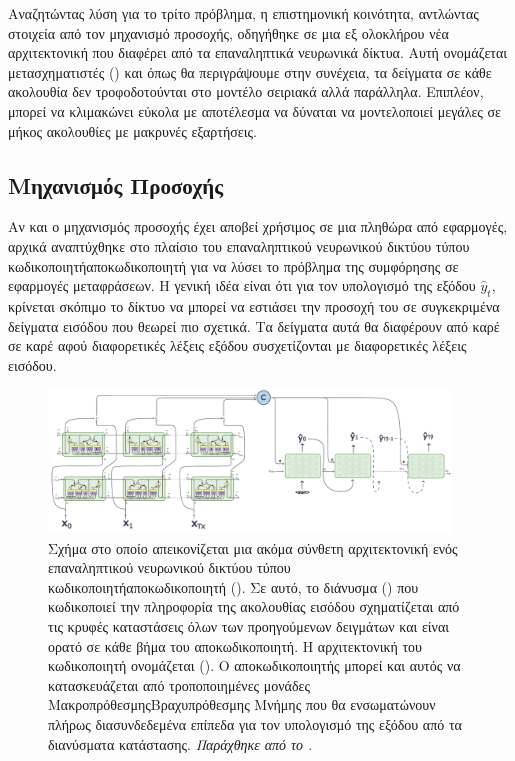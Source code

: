 Αναζητώντας λύση για το τρίτο πρόβλημα, η επιστημονική κοινότητα, αντλώντας στοιχεία από τον μηχανισμό προσοχής, οδηγήθηκε σε μια εξ ολοκλήρου νέα αρχιτεκτονική που διαφέρει από τα επαναληπτικά νευρωνικά δίκτυα. Αυτή ονομάζεται μετασχηματιστές ()\cite{transformers_attention_is_all_you_need} και όπως θα περιγράψουμε στην συνέχεια, τα δείγματα σε κάθε ακολουθία δεν τροφοδοτούνται στο μοντέλο σειριακά αλλά παράλληλα. Επιπλέον, μπορεί να κλιμακώνει εύκολα με αποτέλεσμα να δύναται να μοντελοποιεί μεγάλες σε μήκος ακολουθίες με μακρυνές εξαρτήσεις.\par

\subsection{Μηχανισμός Προσοχής}
Αν και ο μηχανισμός προσοχής έχει αποβεί χρήσιμος σε μια πληθώρα από εφαρμογές, αρχικά αναπτύχθηκε στο πλαίσιο του επαναληπτικού νευρωνικού δικτύου τύπου κωδικοποιητή\textendash αποκωδικοποιητή για να λύσει το πρόβλημα της συμφόρησης σε εφαρμογές μεταφράσεων. Η γενική ιδέα είναι ότι για τον υπολογισμό της εξόδου $\hat{y}_t$, κρίνεται σκόπιμο το δίκτυο να μπορεί να εστιάσει την προσοχή του σε συγκεκριμένα δείγματα εισόδου που θεωρεί πιο σχετικά. Τα δείγματα αυτά θα διαφέρουν από καρέ σε καρέ αφού διαφορετικές λέξεις εξόδου συσχετίζονται με διαφορετικές λέξεις εισόδου.\par

\begin{figure}[h]
  \centering
  \includegraphics[width=0.95\textwidth]{images/chapter theoritical background/rnn_peaky_encoder_decoder_complex.pdf}
  \caption{Σχήμα στο οποίο απεικονίζεται μια ακόμα σύνθετη αρχιτεκτονική ενός επαναληπτικού νευρωνικού δικτύου τύπου κωδικοποιητή\textendash αποκωδικοποιητή (). Σε αυτό, το διάνυσμα () που κωδικοποιεί την πληροφορία της ακολουθίας εισόδου σχηματίζεται από τις κρυφές καταστάσεις όλων των προηγούμενων δειγμάτων και είναι ορατό σε κάθε βήμα του αποκωδικοποιητή. Η αρχιτεκτονική του κωδικοποιητή ονομάζεται  (). Ο αποκωδικοποιητής μπορεί και αυτός να κατασκευάζεται από τροποποιημένες μονάδες Μακροπρόθεσμης\textendash Βραχυπρόθεσμης Μνήμης που θα ενσωματώνουν πλήρως διασυνδεδεμένα επίπεδα για τον υπολογισμό της εξόδου από τα διανύσματα κατάστασης. \textit{Παράχθηκε από το \href{https://inkscape.org/}{}}.}
  \label{fig:rnn_peaky_encoder_decoder_no_attention}
\end{figure}

